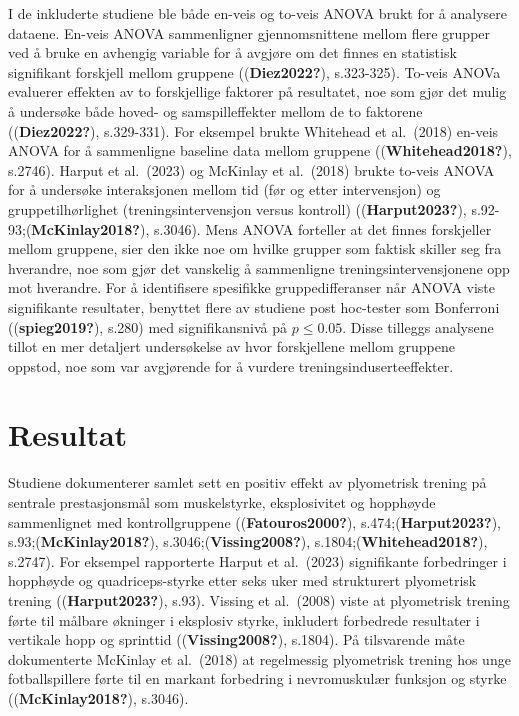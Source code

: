 \documentclass[
  letterpaper,
  DIV=11,
  numbers=noendperiod]{scrreprt}
\begin{document}
I de inkluderte studiene ble både en-veis og to-veis ANOVA brukt for å
analysere dataene. En-veis ANOVA sammenligner gjennomsnittene mellom
flere grupper ved å bruke en avhengig variable for å avgjøre om det
finnes en statistisk signifikant forskjell mellom gruppene
((\textbf{Diez2022?}), s.323-325). To-veis ANOVa evaluerer effekten av
to forskjellige faktorer på resultatet, noe som gjør det mulig å
undersøke både hoved- og samspilleffekter mellom de to faktorene
((\textbf{Diez2022?}), s.329-331). For eksempel brukte Whitehead et
al.~(2018) en-veis ANOVA for å sammenligne baseline data mellom gruppene
((\textbf{Whitehead2018?}), s.2746). Harput et al.~(2023) og McKinlay et
al.~(2018) brukte to-veis ANOVA for å undersøke interaksjonen mellom tid
(før og etter intervensjon) og gruppetilhørlighet (treningsintervensjon
versus kontroll) ((\textbf{Harput2023?}),
s.92-93;(\textbf{McKinlay2018?}), s.3046). Mens ANOVA forteller at det
finnes forskjeller mellom gruppene, sier den ikke noe om hvilke grupper
som faktisk skiller seg fra hverandre, noe som gjør det vanskelig å
sammenligne treningsintervensjonene opp mot hverandre. For å
identifisere spesifikke gruppedifferanser når ANOVA viste signifikante
resultater, benyttet flere av studiene post hoc-tester som Bonferroni
((\textbf{spieg2019?}), s.280) med signifikansnivå på \(p \leq 0.05\).
Disse tilleggs analysene tillot en mer detaljert undersøkelse av hvor
forskjellene mellom gruppene oppstod, noe som var avgjørende for å
vurdere treningsinduserteeffekter.

\section{Resultat}\label{resultat-3}

Studiene dokumenterer samlet sett en positiv effekt av plyometrisk
trening på sentrale prestasjonsmål som muskelstyrke, eksplosivitet og
hopphøyde sammenlignet med kontrollgruppene ((\textbf{Fatouros2000?}),
s.474;(\textbf{Harput2023?}), s.93;(\textbf{McKinlay2018?}),
s.3046;(\textbf{Vissing2008?}), s.1804;(\textbf{Whitehead2018?}),
s.2747). For eksempel rapporterte Harput et al.~(2023) signifikante
forbedringer i hopphøyde og quadriceps-styrke etter seks uker med
strukturert plyometrisk trening ((\textbf{Harput2023?}), s.93). Vissing
et al.~(2008) viste at plyometrisk trening førte til målbare økninger i
eksplosiv styrke, inkludert forbedrede resultater i vertikale hopp og
sprinttid ((\textbf{Vissing2008?}), s.1804). På tilsvarende måte
dokumenterte McKinlay et al.~(2018) at regelmessig plyometrisk trening
hos unge fotballspillere førte til en markant forbedring i nevromuskulær
funksjon og styrke ((\textbf{McKinlay2018?}), s.3046).
\end{document}
